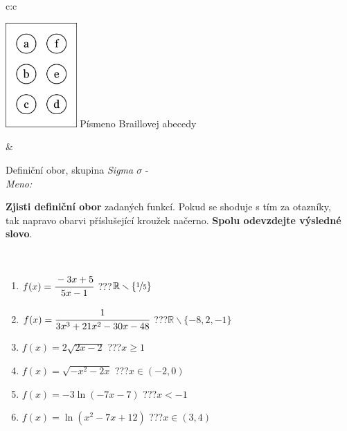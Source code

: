 \documentclass[10pt]{report}
\begin{document}
\begin{tabular}{c:c}
\begin{minipage}[c][104.5mm][t]{0.5\linewidth}
\begin{center}
\begin{minipage}{0.20\linewidth}
\begin{center}
\includegraphics[height=40mm]{../images/braille.png}
{\small Písmeno Braillovej abecedy}
\end{center}
\end{minipage}
\end{center}
\end{minipage}
&
\begin{minipage}[c][104.5mm][t]{0.5\linewidth}
\begin{center}
\vspace{7mm}
{\huge Definiční obor, skupina \textit{Sigma $\sigma$} -}\\[5mm]
\textit{Meno:}\phantom{xxxxxxxxxxxxxxxxxxxxxxxxxxxxxxxxxxxxxxxxxxxxxxxxxxxxxxxxxxxxxxxxx}\\[5mm]
\begin{minipage}{0.95\linewidth}
\textbf{Zjisti definiční obor} zadaných funkcí. Pokud se shoduje s tím za otazníky,\\tak napravo obarvi příslušející kroužek načerno. \textbf{Spolu odevzdejte výsledné slovo}.
\end{minipage}
\\[1mm]
\begin{minipage}{0.79\linewidth}
\begin{center}
\begin{varwidth}{\linewidth}
\begin{enumerate}
\normalsizerrr
\item $f(x)=\cfrac{-3x+5}{5x-1}$\quad \dotfill\; ???\;\dotfill \quad $\mathbb{R}\smallsetminus\{\nicefrac{1}{5}\}$
\item $f(x)=\cfrac{1}{3x^3+21x^2-30x-48}$\quad \dotfill\; ???\;\dotfill \quad $\mathbb{R}\smallsetminus\{-8,2,-1\}$
\item $f(x)=2\sqrt{2x-2}$\quad \dotfill\; ???\;\dotfill \quad $x\geq1$
\item $f(x)=\sqrt{-x^2-2x}$\quad \dotfill\; ???\;\dotfill \quad $x\in(-2 , 0)$
\item $f(x)=-3\ln{(-7x-7)}$\quad \dotfill\; ???\;\dotfill \quad $x<-1$
\item $f(x)=\ln{(x^2-7x+12)}$\quad \dotfill\; ???\;\dotfill \quad $x\in(3 , 4)$

\end{enumerate}
\end{varwidth}
\end{center}
\end{minipage}
\end{center}
\end{minipage}
\end{tabular}
\end{document}
